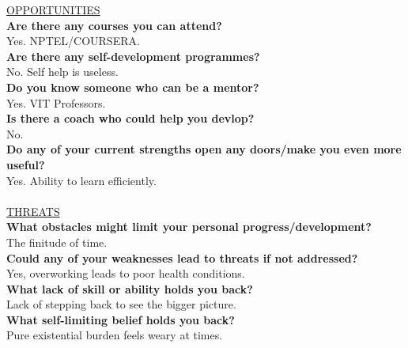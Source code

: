 \documentclass{article}
\begin{document}
\underline{OPPORTUNITIES}\\
\textbf{Are there any courses you can attend?}\\
Yes. NPTEL/COURSERA.\\
\textbf{Are there any self-development programmes?}\\
No. Self help is useless.\\
\textbf{Do you know someone who can be a mentor?}\\
Yes. VIT Professors.\\
\textbf{Is there a coach who could help you devlop?}\\
No.\\
\textbf{Do any of your current strengths open any doors/make you even more useful?}\\
Yes. Ability to learn efficiently.\\
\\
\underline{THREATS}\\
\textbf{What obstacles might limit your personal progress/development?}\\
The finitude of time.\\
\textbf{Could any of your weaknesses lead to threats if not addressed?}\\
Yes, overworking leads to poor health conditions.\\
\textbf{What lack of skill or ability holds you back?}\\
Lack of stepping back to see the bigger picture.\\
\textbf{What self-limiting belief holds you back?}\\
Pure existential burden feels weary at times.\\
\end{document}
